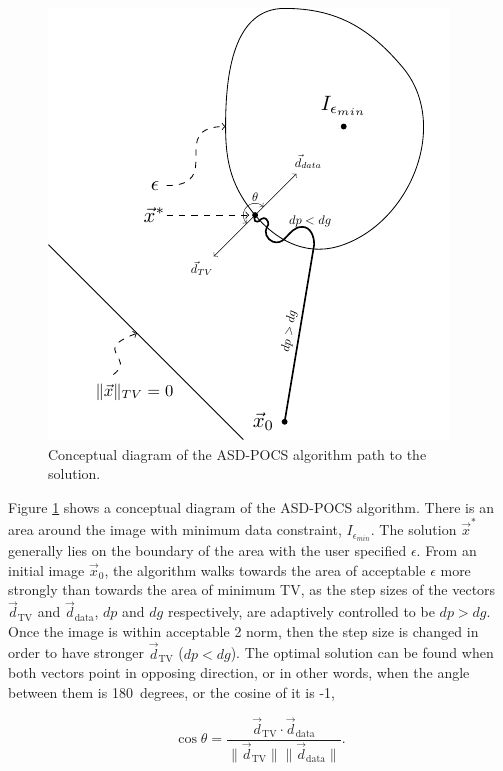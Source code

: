 \begin{figure}[H]
\begin{center}

\includegraphics[scale=1.2]{RecAlgorithms/POCS.pdf} 
\end{center}

\caption[Diagram of the POCS algorithm]{\label{fig:POCSAlgo} Conceptual diagram of the ASD-POCS algorithm path to the solution.} 
\end{figure}


Figure \ref{fig:POCSAlgo} shows a conceptual diagram of the ASD-POCS algorithm. There is an area around the image with minimum data constraint, $I_{\epsilon_{min}}$. The solution $\vec{x}^*$ generally lies on the boundary of the area with the user specified $\epsilon$. From an initial image $\vec{x}_0$, the algorithm walks towards the area of acceptable $\epsilon$ more strongly than towards the area of minimum TV, as the step sizes of the vectors $\vec{d}_{\text{TV}}$ and $\vec{d}_{\text{data}}$, $dp$ and $dg$ respectively, are adaptively controlled to be $dp>dg$. Once the image is within acceptable 2 norm, then the step size is changed in order to have stronger $\vec{d}_{\text{TV}}$ ($dp<dg$). The optimal solution can be found when both vectors point in opposing direction, or in other words, when the angle between them is 180\ degrees, or the cosine of it is -1,

\begin{equation}
\cos \theta = \frac{\vec{d}_{\text{TV}} \cdot \vec{d}_{\text{data}}}{\lVert\vec{d}_{\text{TV}}\rVert \lVert\vec{d}_{\text{data}}\rVert }.
\end{equation}


